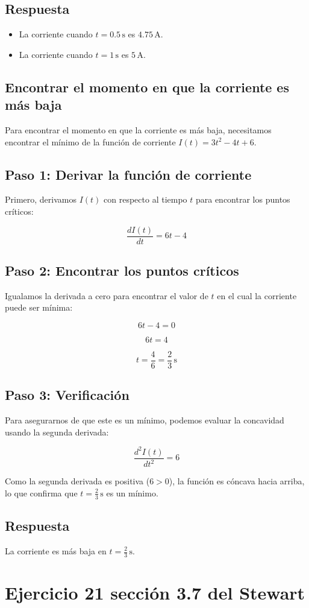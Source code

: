 \documentclass[11pt,letterpaper]{article}
\begin{document}
\subsection*{Respuesta}

\begin{itemize}
    \item La corriente cuando \( t = 0.5 \, \text{s} \) es \( 4.75 \, \text{A} \).
    \item La corriente cuando \( t = 1 \, \text{s} \) es \( 5 \, \text{A} \).
\end{itemize}

\subsection*{Encontrar el momento en que la corriente es más baja}

Para encontrar el momento en que la corriente es más baja, necesitamos encontrar el mínimo de la función de corriente \( I(t) = 3t^2 - 4t + 6 \).

\subsection*{Paso 1: Derivar la función de corriente}

Primero, derivamos \( I(t) \) con respecto al tiempo \( t \) para encontrar los puntos críticos:

\[
\frac{dI(t)}{dt} = 6t - 4
\]

\subsection*{Paso 2: Encontrar los puntos críticos}

Igualamos la derivada a cero para encontrar el valor de \( t \) en el cual la corriente puede ser mínima:

\[
6t - 4 = 0
\]

\[
6t = 4
\]

\[
t = \frac{4}{6} = \frac{2}{3} \, \text{s}
\]

\subsection*{Paso 3: Verificación}

Para asegurarnos de que este es un mínimo, podemos evaluar la concavidad usando la segunda derivada:

\[
\frac{d^2I(t)}{dt^2} = 6
\]

Como la segunda derivada es positiva (\( 6 > 0 \)), la función es cóncava hacia arriba, lo que confirma que \( t = \frac{2}{3} \, \text{s} \) es un mínimo.

\subsection*{Respuesta}

La corriente es más baja en \( t = \frac{2}{3} \, \text{s} \).

\section*{Ejercicio 21 sección 3.7 del Stewart}
\end{document}
